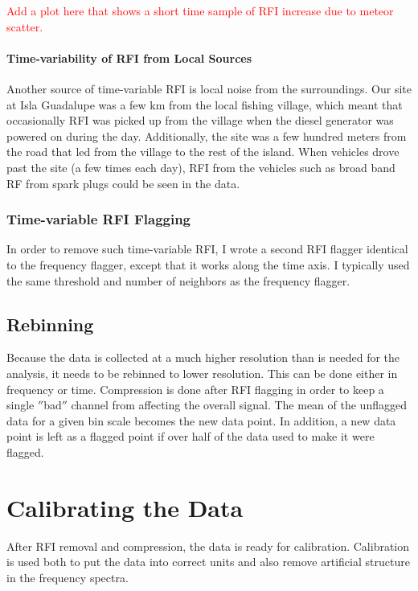 \textcolor{red}{Add a plot here that shows a short time sample of RFI increase due to meteor scatter.}

\paragraph{Time-variability of RFI from Local Sources}

Another source of time-variable RFI is local noise from the surroundings. Our site at Isla Guadalupe was a few km from the local fishing village, which meant that occasionally RFI was picked up from the village when the diesel generator was powered on during the day. Additionally, the site was a few hundred meters from the road that led from the village to the rest of the island. When vehicles drove past the site (a few times each day), RFI from the vehicles such as broad band RF from spark plugs could be seen in the data. 

\subsubsection{Time-variable RFI Flagging}

In order to remove such time-variable RFI, I wrote a second RFI flagger identical to the frequency flagger, except that it works along the time axis. I typically used the same threshold and number of neighbors as the frequency flagger. 

\subsection{Rebinning}

Because the data is collected at a much higher resolution than is needed for the analysis, it needs to be rebinned to lower resolution. This can be done either in frequency or time. Compression is done after RFI flagging in order to keep a single $''$bad$''$ channel from affecting the overall signal. The mean of the unflagged data for a given bin scale becomes the new data point. In addition, a new data point is left as a flagged point if over half of the data used to make it were flagged. 

\section{Calibrating the Data}

After RFI removal and compression, the data is ready for calibration. Calibration is used both to put the data into correct units and also remove artificial structure in the frequency spectra. 

